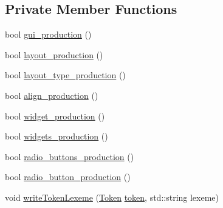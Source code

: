 \subsection*{Private Member Functions}
\begin{DoxyCompactItemize}
\item 
bool \hyperlink{class_parser_aa1ca665de0b8bb360a8bb084c4044861}{gui\+\_\+production} ()
\item 
bool \hyperlink{class_parser_a5edcbcd8826520596b79dae93096425d}{layout\+\_\+production} ()
\item 
bool \hyperlink{class_parser_a7a248c83d07922badb615458a943d5dc}{layout\+\_\+type\+\_\+production} ()
\item 
bool \hyperlink{class_parser_a7576c690add9d1f68a5781c8c240d6a1}{align\+\_\+production} ()
\item 
bool \hyperlink{class_parser_ac5fd99f9c1c8e4c72c04c0a4c58a5caf}{widget\+\_\+production} ()
\item 
bool \hyperlink{class_parser_a9d1dce16ca4c75ff9a3208cc8200dd23}{widgets\+\_\+production} ()
\item 
bool \hyperlink{class_parser_a3cd45dd7f2cf5d84955ac8efca423073}{radio\+\_\+buttons\+\_\+production} ()
\item 
bool \hyperlink{class_parser_a67083b88f1f2755a7ea81830524c1551}{radio\+\_\+button\+\_\+production} ()
\item 
void \hyperlink{class_parser_a70c67e7914ab1daad785f3d96ca40b6a}{write\+Token\+Lexeme} (\hyperlink{_lexer_8h_a6a9e93b081bad7fc74c17306fb168c1f}{Token} \hyperlink{class_parser_a77945ac7a42745c4655c2cfd0152c891}{token}, std\+::string lexeme)
\end{DoxyCompactItemize}
